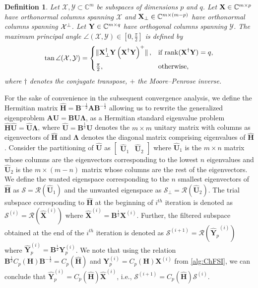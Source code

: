 \documentclass[preprint,3p,number,sort&compress]{elsarticle}
\newtheorem{definition}[theorem]{Definition}
\newcommand{\bA}{\textbf{A}}
\newcommand{\bB}{\textbf{B}}
\newcommand{\bH}{\textbf{H}}
\newcommand{\bX}{\textbf{X}}
\newcommand{\bY}{\textbf{Y}}
\newcommand{\bU}{\textbf{U}}
\newcommand{\bLam}{\boldsymbol{\Lambda}}
\newcommand{\cblue }{\color{black}}
\newcommand{\cn}{\color{black}}
\DeclarePairedDelimiter\norm{\lVert}{\rVert\,}%
\begin{document}
\begin{definition}
\cblue Let $\mathcal{X},\mathcal{Y}\subset\mathbb{C}^{m}$ be subspaces of dimensions $p$ and $q$. 
Let $\normalfont \bX\in\mathbb{C}^{m\times p}$ have orthonormal columns spanning $\mathcal{X}$ and 
$\normalfont\bX_\perp\in\mathbb{C}^{m\times (m-p)}$ have orthonormal columns spanning $\normalfont\mathcal{X}^\perp$. 
Let $\normalfont\bY\in\mathbb{C}^{m\times q}$ have orthogonal columns spanning $\mathcal{Y}$. 
The maximum principal angle $\angle(\mathcal{X},\mathcal{Y})\in[0,\tfrac{\pi}{2}]$ is defined by
 \begin{align*}
\normalfont\tan\angle(\mathcal{X},\mathcal{Y})=\normalfont
\begin{cases}
\norm{\bX_\perp^{\dagger}\bY\left(\bX^{\dagger}\bY\right)^{+}}, 
& \text{if }\mathrm{rank}(\bX^{\dagger}\bY)=q, \\[6pt]
\frac{\pi}{2}, & \text{otherwise},
\end{cases}
 \end{align*}
where $\dagger$ denotes the conjugate transpose, $+$ the Moore--Penrose inverse.\cn\label{def:angle}
\end{definition}
For the sake of convenience in the subsequent convergence analysis, we define the Hermitian matrix $\hat{\bH}=\bB^{-\frac{1}{2}}\bA\bB^{-\frac{1}{2}}$ allowing us to rewrite the generalized eigenproblem $\bA\bU=\bB\bU\bLam$, as a Hermitian standard eigenvalue problem $\hat{\bH}\hat{\bU}=\hat{\bU}\bLam$, where $\hat{\bU}=\bB^{\frac{1}{2}}\bU$ denotes the $m\times m$ unitary matrix with columns as eigenvectors of $\hat{\bH}$ and $\bLam$ denotes the diagonal matrix comprising eigenvalues of $\hat{\bH}$. Consider the partitioning of $\hat{\bU}$ as $\begin{bmatrix}\hat{\bU}_1 & \hat{\bU}_2\end{bmatrix}$ where $\hat{\bU}_1$ is the $m\times n$ matrix whose columns are the eigenvectors corresponding to the lowest $n$ eigenvalues and $\hat{\bU}_2$ is the $m\times(m-n)$ matrix whose columns are the rest of the eigenvectors. We define the wanted eigenspace corresponding to the $n$ smallest eigenvectors of $\hat{\bH}$ as $\mathcal{S}=\mathcal{R}(\hat{\bU}_1)$ and the unwanted eigenspace as $\mathcal{S}_\perp=\mathcal{R}(\hat{\bU}_2)$. The trial subspace corresponding to $\hat{\bH}$ at the beginning of $i^{th}$ iteration is denoted as $\mathcal{S}^{(i)}=\mathcal{R}(\hat{\bX}^{(i)})$ where $\hat{\bX}^{(i)}=\bB^{\frac{1}{2}}\bX^{(i)}$. Further, the filtered subspace obtained at the end of the $i^{th}$ iteration is denoted as $\mathcal{S}^{(i+1)}=\mathcal{R}({\hat{\bY}_{p}}^{(i)})$ where $\hat{\bY}^{(i)}_p=\bB^{\frac{1}{2}}\bY^{(i)}_p$. We note that using the relation $\bB^{\frac{1}{2}}C_p(\bH)\bB^{-\frac{1}{2}}=C_p(\hat{\bH})$ and $\bY_p^{(i)}=C_p(\bH)\bX^{(i)}$ from \cref{alg:ChFSI}, we can conclude that $\hat{\bY}^{(i)}_p = C_p(\hat{\bH}) \hat{\bX}^{(i)}$, i.e., $\mathcal{S}^{(i+1)}=C_p(\hat{\bH})\mathcal{S}^{(i)}$. 
\end{document}
